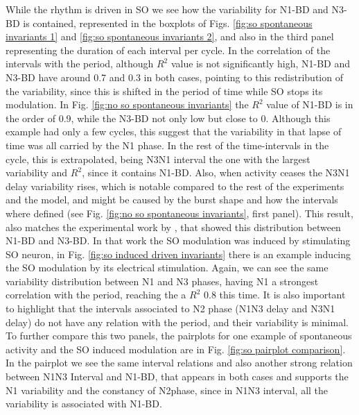 While the rhythm is driven in SO we see how the variability for N1-BD and N3-BD is contained, represented in the boxplots of Figs. \ref{fig:so spontaneous invariants 1} and \ref{fig:so spontaneous invariants 2}, and also in the third panel representing the duration of each interval per cycle. In the correlation of the intervals with the period, although $R^2$ value is not significantly high, N1-BD and N3-BD have around 0.7 and 0.3 in both cases, pointing to this redistribution of the variability, since this is shifted in the period of time while SO stops its modulation. In Fig. \ref{fig:no so spontaneous invariants} the $R^2$ value of N1-BD is in the order of 0.9, while the N3-BD not only low but close to 0. Although this example had only a few cycles, this suggest that the variability in that lapse of time was all carried by the N1 phase. In the rest of the time-intervals in the cycle, this is extrapolated, being N3N1 interval the one with the largest variability and $R^2$, since it contains N1-BD. Also, when activity ceases the N3N1 delay variability rises, which is notable compared to the rest of the experiments and the model, and might be caused by the burst shape and how the intervals where defined (see Fig. \ref{fig:no so spontaneous invariants}, first panel). This result, also matches the experimental work by \cite{elliott_temporal_1991}, that showed this distribution between N1-BD and N3-BD. In that work the SO modulation was induced by stimulating SO neuron, in Fig. \ref{fig:so induced driven invariants} there is an example inducing the SO modulation by its electrical stimulation. Again, we can see the same variability distribution between N1 and N3 phases, having N1 a strongest correlation with the period, reaching the a $R^2$ 0.8 this time. It is also important to highlight that the intervals associated to N2 phase (N1N3 delay and N3N1 delay) do not have any relation with the period, and their variability is minimal. To further compare this two panels, the pairplots for one example of spontaneous activity and the SO induced modulation are in Fig. \ref{fig:so pairplot comparison}. In the pairplot we see the same interval relations and also another strong relation between N1N3 Interval and N1-BD, that appears in both cases and supports the N1 variability and the constancy of N2phase, since in N1N3 interval, all the variability is associated with N1-BD. 

 
